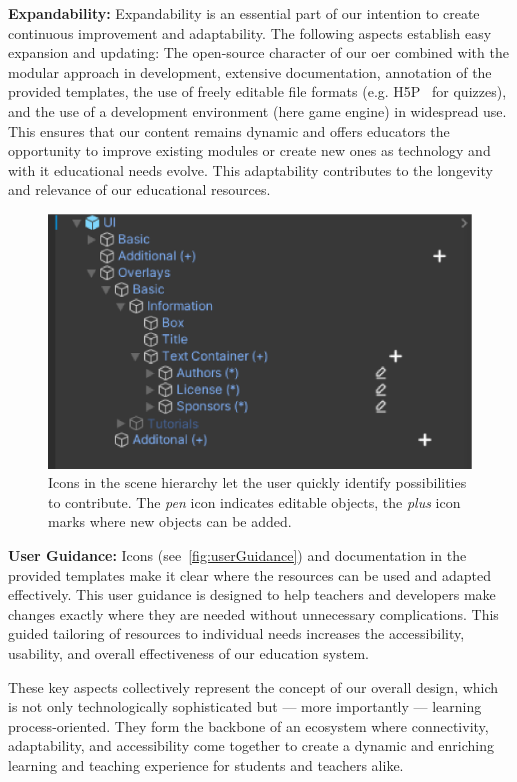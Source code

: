 \textbf{Expandability:}
Expandability is an essential part of our intention to create continuous improvement and adaptability. The following aspects establish easy expansion and updating: The open-source character of our \acrshort{oer} combined with the modular approach in development, extensive documentation, annotation of the provided templates, the use of freely editable file formats (e.g. H5P~\cite{Singleton_Charlton_2019} for quizzes), and the use of a development environment (here game engine) in widespread use. This ensures that our content remains dynamic and offers educators the opportunity to improve existing modules or create new ones as technology and with it educational needs evolve. This adaptability contributes to the longevity and relevance of our educational resources.

\begin{figure}[tb]
	\centering
	\includegraphics[width=0.6\linewidth]{pictures/userGuidance_Icons.png}
	\captionsetup{labelfont=bf,textfont=it}
	\caption[Icons indicate user interaction.]{Icons in the scene hierarchy let the user quickly identify possibilities to contribute. The \emph{pen} icon indicates editable objects, the \emph{plus} icon marks where new objects can be added.\label{fig:userGuidance}}
\end{figure}

\textbf{User Guidance:}
Icons (see~\autoref{fig:userGuidance}) and documentation in the provided templates make it clear where the resources can be used and adapted effectively. This user guidance is designed to help teachers and developers make changes exactly where they are needed without unnecessary complications. This guided tailoring of resources to individual needs increases the accessibility, usability, and overall effectiveness of our education system.

These key aspects collectively represent the concept of our overall design, which is not only technologically sophisticated but --- more importantly --- learning process-oriented. They form the backbone of an ecosystem where connectivity, adaptability, and accessibility come together to create a dynamic and enriching learning and teaching experience for students and teachers alike.


